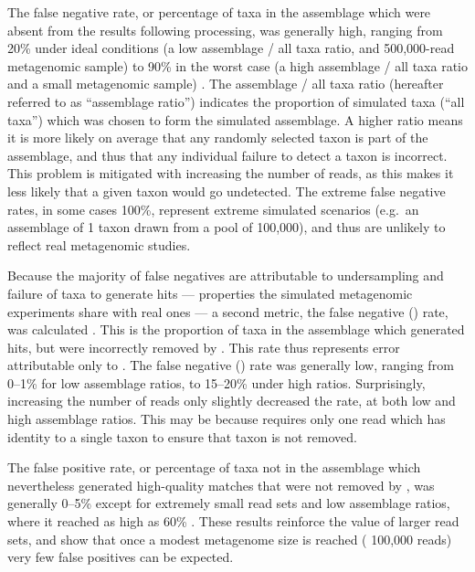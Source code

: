 The false negative rate, or percentage of taxa in the assemblage which were absent from the  results following  processing, was generally high, ranging from \textapprox{} 20\% under ideal conditions (a low assemblage / all taxa ratio, and 500,000-read metagenomic sample) to \textapprox{} 90\% in the worst case (a high assemblage / all taxa ratio and a small metagenomic sample) .
The assemblage / all taxa ratio (hereafter referred to as ``assemblage ratio'') indicates the proportion of simulated taxa (``all taxa'') which was chosen to form the simulated assemblage.
A higher ratio means it is more likely on average that any randomly selected taxon is part of the assemblage, and thus that any individual failure to detect a taxon is incorrect.
This problem is mitigated with increasing the number of reads, as this makes it less likely that a given taxon would go undetected.
The extreme false negative rates, in some cases 100\%, represent extreme simulated scenarios (e.g.\ an assemblage of 1 taxon drawn from a pool of 100,000), and thus are unlikely to reflect real metagenomic studies.

Because the majority of false negatives are attributable to undersampling and failure of taxa to generate  hits --- properties the simulated metagenomic experiments share with real ones --- a second metric, the false negative () rate, was calculated .
This is the proportion of taxa in the assemblage which generated  hits, but were incorrectly removed by .
This rate thus represents error attributable only to .
The false negative () rate was generally low, ranging from \textapprox{} 0--1\% for low assemblage ratios, to \textapprox{} 15--20\% under high ratios.
Surprisingly, increasing the number of reads only slightly decreased the rate, at both low and high assemblage ratios.
This may be because  requires only one read which has identity to a single taxon to ensure that taxon is not removed.

The false positive rate, or percentage of taxa not in the assemblage which nevertheless generated high-quality  matches that were not removed by , was generally \textapprox{} 0--5\% except for extremely small read sets and low assemblage ratios, where it reached as high as 60\% .
These results reinforce the value of larger read sets, and show that once a modest metagenome size is reached (\textapprox{} 100,000 reads) very few false positives can be expected.

